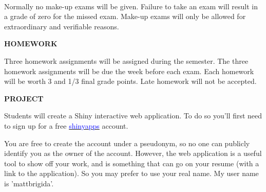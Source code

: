 \documentclass{article}
\begin{document}
\\
Normally no make-up exams will be given.  Failure to take an exam will result in a grade of zero for the missed exam.  Make-up exams will only be allowed for extraordinary and verifiable reasons.
\\
\begin{center}
{\bf HOMEWORK}
\end{center}
Three homework assignments will be assigned during the semester.   The three homework assignments will be due the week before each exam. Each homework will be worth 3 and 1/3 final grade points.  Late homework will not be accepted.
\\
\begin{center}
{\bf PROJECT}
\end{center}
Students will create a Shiny interactive web application.  To do so you'll first need to sign up for a free \href{https://www.shinyapps.io/}{\textcolor{blue}{shinyapps}} account.  

You are free to create the account under a pseudonym, so no one can publicly identify you as the owner of the account.  However, the web application is a useful tool to show off your work, and is something that can go on your resume (with a link to the application).  So you may prefer to use your real name.  My user name is 'mattbrigida'.  
\end{document}
